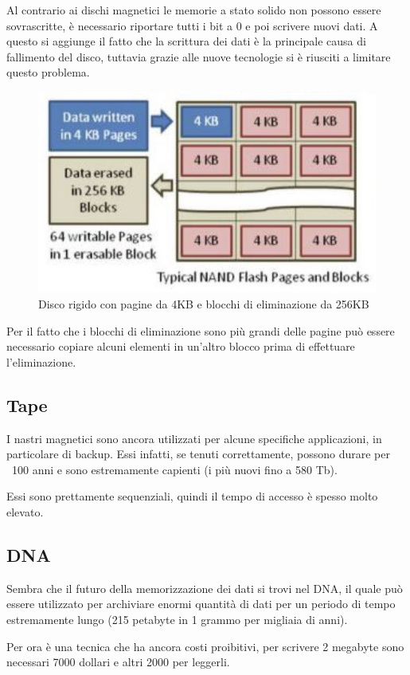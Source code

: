 \spacer
Al contrario ai dischi magnetici le memorie a stato solido non possono essere sovrascritte, è necessario riportare tutti i bit a 0 e poi scrivere nuovi dati.
A questo si aggiunge il fatto che la scrittura dei dati è la principale causa di fallimento del disco, tuttavia grazie alle nuove tecnologie si è riusciti a limitare questo problema.

\begin{figure}[H]
    \centering
    \includegraphics[width=0.5\linewidth]{assets/SSD.jpg}
    \caption{Disco rigido con pagine da 4KB e blocchi di eliminazione da 256KB}
\end{figure}

Per il fatto che i blocchi di eliminazione sono più grandi delle pagine può essere necessario copiare alcuni elementi in un'altro blocco prima di effettuare l'eliminazione.

\subsection{Tape}
I nastri magnetici sono ancora utilizzati per alcune specifiche applicazioni, in particolare di backup.
Essi infatti, se tenuti correttamente, possono durare per ~100 anni e sono estremamente capienti (i più nuovi fino a 580 Tb).

Essi sono prettamente sequenziali, quindi il tempo di accesso è spesso molto elevato.

\subsection{DNA}
Sembra che il futuro della memorizzazione dei dati si trovi nel DNA, il quale può essere utilizzato per archiviare enormi quantità di dati per un periodo di tempo estremamente lungo (215 petabyte in 1 grammo per migliaia di anni).

\spacer
Per ora è una tecnica che ha ancora costi proibitivi, per scrivere 2 megabyte sono necessari 7000 dollari e altri 2000 per leggerli.
